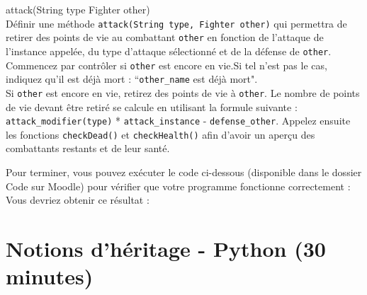 \begin{Exercice}[10 minutes] attack(String type Fighter other)\\
    Définir une méthode \lstinline{attack(String type, Fighter other)} qui permettra de retirer des points de vie au combattant \lstinline{other} en fonction de l'attaque de l'instance appelée, du type d'attaque sélectionné et de la défense de \lstinline{other}. \\
    
    Commencez par contrôler si \lstinline{other} est encore en vie.Si tel n'est pas le cas, indiquez qu'il est déjà mort : ``\lstinline{other_name} est déjà mort". \\
     Si \lstinline{other} est encore en vie, retirez des points de vie à \lstinline{other}. Le nombre de points de vie devant être retiré se calcule en utilisant la formule suivante : \lstinline{attack_modifier(type)} * \lstinline{attack_instance} - \lstinline{defense_other}. Appelez ensuite les fonctions \lstinline{checkDead()} et \lstinline{checkHealth()} afin d'avoir un aperçu des combattants restants et de leur santé.
    
\begin{solution}
	
\end{solution}
\end{Exercice}
Pour terminer, vous pouvez exécuter le code ci-dessous (disponible dans le dossier Code sur Moodle) pour vérifier que votre programme fonctionne correctement : \\

Vous devriez obtenir ce résultat : \\



\section{Notions d'héritage - Python (30 minutes)}

